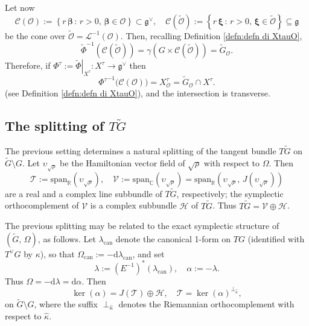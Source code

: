 \documentclass[12pt,a4paper]{article}
\theoremstyle{plain}
\theoremstyle{definition}
\begin{document}
Let now 
$$
\mathcal{C}(\mathcal{O}):=
\left\{r\,\boldsymbol{\beta}\,:\,r>0,\,\boldsymbol{\beta}
\in \mathcal{O}\right\}\subset \mathfrak{g}^\vee,
\quad
\mathcal{C}(\tilde{\mathcal{O}}):=
\left\{r\,\boldsymbol{\xi}\,:\,r>0,\,\boldsymbol{\xi}
\in \tilde{\mathcal{O}}\right\}\subseteq \mathfrak{g}
$$
be the cone over $\tilde{\mathcal{O}}=\mathcal{L}^{-1}(\mathcal{O})$. 
Then, recalling Definition \ref{defn:defn di XtauO},
\begin{equation}
\label{eqn:defn di tildeGO}
\tilde{\Phi}^{-1}\left(\mathcal{C}(\tilde{\mathcal{O}})\right)=
\gamma\left(G\times \mathcal{C}(\tilde{\mathcal{O}})\right)
=
\tilde{G}_{\mathcal{O}}
.
\end{equation}
%
%
Therefore, if $\Phi^\tau:=\left.\tilde{\Phi}\right|_{X^\tau}:X^\tau\rightarrow\mathfrak{g}^\vee$ then
\begin{equation}
\label{eqn:XtauO GtauO}
{\Phi^\tau}^{-1}\big(\mathcal{C}(\mathcal{O})\big)=X^\tau_{\mathcal{O}}
=\tilde{G}_{\mathcal{O}}\cap X^\tau.
\end{equation}
%
(see Definition \ref{defn:defn di XtauO}), 
and the intersection is transverse.



\subsection{The splitting of $T\tilde{G}$}
\label{sctn:splitting alpha}

The previous setting determines a natural splitting of the
tangent bundle $T\tilde{G}$ on $\tilde{G}\setminus G$.
Let $\upsilon_{\sqrt{\rho}}$ be the Hamiltonian vector field of
$\sqrt{\rho}$ with respect to $\Omega$.
Then 
\begin{equation}
\label{eqn:VT vector bundles}
\mathcal{T}:=\mathrm{span}_{\mathbb{R}}\left(\upsilon_{\sqrt{\rho}}  \right),\quad
\mathcal{V}:=\mathrm{span}_{\mathbb{C}}\left(\upsilon_{\sqrt{\rho}}  \right)
=\mathrm{span}_{\mathbb{R}}
\left(\upsilon_{\sqrt{\rho}} ,\,J\left(\upsilon_{\sqrt{\rho}}  \right)  \right)
\end{equation}
%
are a real and a complex line subbundle of $T\tilde{G}$, respectively; the symplectic orthocomplement of $\mathcal{V}$ is a complex subbundle 
$\mathcal{H}$ of $T\tilde{G}$. 
%
Thus $T\tilde{G}=\mathcal{V}\oplus \mathcal{H}$. 

The previous splitting may be related to the exact symplectic structure of
$(\tilde{G},\,\Omega)$, as follows.
%
Let $\lambda_{\mathrm{can}}$ denote the canonical 1-form on $TG$ (identified with
$T^\vee G$ by $\kappa$), 
so that $\Omega_{\mathrm{can}}:=-\mathrm{d}\lambda_{\mathrm{can}}$,
and set
$$
\lambda:=(E^{-1})^*(\lambda_{\mathrm{can}}),\quad
\alpha:=-\lambda.
$$
Thus $\Omega=-\mathrm{d}\lambda=\mathrm{d}\alpha$.
Then
$$
\ker(\alpha)=J(\mathcal{T})\oplus \mathcal{H},\quad
\mathcal{T}=\ker(\alpha)^{\perp_{\hat{\kappa}}},
$$
 on $\tilde{G}\setminus G$,
 where the suffix $\perp_{\hat{\kappa}}$ denotes the Riemannian orthocomplement with respect to $\hat{\kappa}$.
\end{document}
